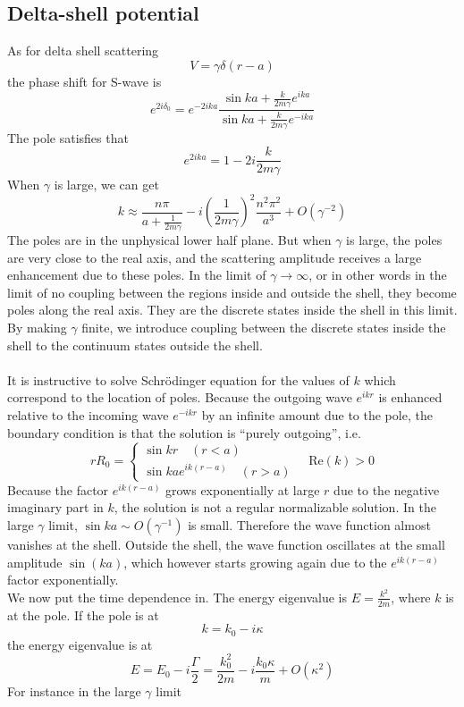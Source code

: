\subsection{Delta-shell potential}
As for delta shell scattering
\[V = \gamma\delta(r-a)\]
the phase shift for S-wave is
\[e^{2i\delta_0} = e^{-2ika}\frac{\sin ka + \frac{k}{2m\gamma}e^{ika}}{\sin ka + \frac{k}{2m\gamma}e^{-ika}}\]
The pole satisfies that
\[e^{2ika} = 1 - 2i\frac{k}{2m\gamma}\]
When $\gamma$ is large, we can get
\[k \approx \frac{n\pi}{a + \frac{1}{2m\gamma}} -i \left(\frac{1}{2m\gamma} \right)^2 \frac{n^2\pi^2}{a^3} + O(\gamma^{-2})\]
The poles are in the unphysical lower half plane. But when $\gamma$ is large, the poles are very close to the real axis, and the scattering amplitude receives a large enhancement due to these poles. 
In the limit of $\gamma \to \infty$, or in other words in the limit of no coupling between the regions inside and outside the shell, they become poles along the real axis. 
They are the discrete states inside the shell in this limit. 
By making $\gamma$ finite, we introduce coupling between the discrete states inside the shell to the continuum states outside the shell.
\\ \\
It is instructive to solve Schr\"{o}dinger equation for the values of $k$ which correspond to the location of poles. Because the outgoing wave $e^{ikr}$ is enhanced relative to the incoming wave $e^{-ikr}$ by an infinite amount due to the pole, the boundary condition is that the solution is ``purely outgoing'', i.e.
\[rR_0 = \begin{cases} \sin kr \quad (r<a) \\ \sin ka e^{ik(r-a)} \quad (r>a)  \end{cases} \quad \mathrm{Re}(k) > 0\]
Because the factor $e^{ik(r-a)}$ grows exponentially at large $r$ due to the negative imaginary part in $k$, the solution is not a regular normalizable solution.
In the large $\gamma$ limit, $\sin ka \sim O(\gamma^{-1})$ is small. Therefore the wave function almost vanishes at the shell.
Outside the shell, the wave function oscillates at the small amplitude $\sin(ka)$, which however starts growing again due to the $e^{ik(r-a)}$ factor exponentially.
\\
We now put the time dependence in. The energy eigenvalue
is $E = \frac{k^2}{2m}$, where $k$ is at the pole. If the pole is at
\[k = k_0 - i\kappa\]
the energy eigenvalue is at
\[E = E_0 - i\frac{\Gamma}{2} = \frac{k_0^2}{2m} - i \frac{k_0\kappa}{m} + O(\kappa^2)\]
For instance in the large $\gamma$ limit
